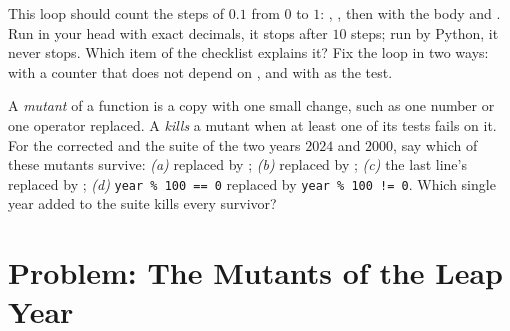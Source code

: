 \begin{exercise}[$\star\star\star$]\label{exo:g10:specifications-and-tests:14}
This loop should count the steps of $0.1$ from $0$ to $1$: , , then
 with the body  and . Run in your head with exact
decimals, it stops after $10$ steps; run by Python, it never stops. Which item of the checklist explains it? Fix the
loop in two ways: with a counter that does not depend on , and with  as the test.
\end{exercise}

\begin{exercise}[$\star\star\star$]\label{exo:g10:specifications-and-tests:15}
A \emph{mutant} of a function is a copy with one small change, such as one number or one operator replaced. A  \emph{kills} a mutant when at least one of its tests fails on it. For the corrected  and the
suite of the two years $2024$ and $2000$, say which of these mutants survive: \emph{(a)}  replaced by
; \emph{(b)}  replaced by ; \emph{(c)} the last line's 
replaced by ; \emph{(d)} \texttt{year \% 100 == 0} replaced by \texttt{year \% 100 != 0}. Which single year
added to the suite kills every survivor?
\end{exercise}

\section{Problem: The Mutants of the Leap Year}\label{sec:g10:specifications-and-tests:problem}

